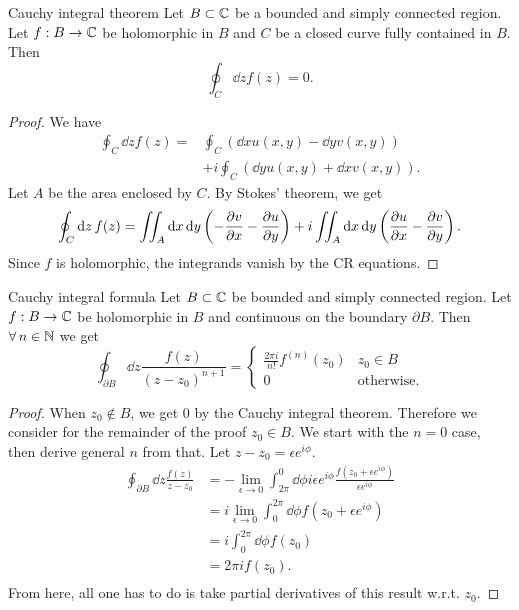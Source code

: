 \begin{theorem}{Cauchy integral theorem}{}
Let $B\subset\mathbb{C}$ be a bounded and simply connected region. Let $f:B\to\mathbb{C}$ be
holomorphic in $B$ and $C$ be a closed curve fully contained in $B$. Then
$$
  \oint_C\dd{z}f(z)=0.
$$
\begin{proof}
We have
\begin{equation*}\begin{aligned}
\oint_C\dd{z}f(z)=&\oint_C\left(\dd{x}u(x,y)-\dd{y}v(x,y)\right)\\
                 &+i\oint_C\left(\dd{y}u(x,y)+\dd{x}v(x,y)\right).
\end{aligned}\end{equation*}
Let $A$ be the area enclosed by $C$. By Stokes' theorem, we get
\begin{equation*}
\oint_C\dd{z}f(z)=\iint_A\dd{x}\dd{y}\left(-\pdv{v}{x}-\pdv{u}{y}\right)
                   +i\iint_A\dd{x}\dd{y}\left(\pdv{u}{x}-\pdv{v}{y}\right).
\end{equation*}
Since $f$ is holomorphic, the integrands vanish by the CR equations.
\end{proof}
\end{theorem}

\begin{theorem}{Cauchy integral formula}{}
Let $B\subset\mathbb{C}$ be bounded and simply connected region. Let $f:B\to\mathbb{C}$ be
holomorphic in $B$ and continuous on the boundary $\partial B$.
Then $\operatorname{\forall} n\in\mathbb{N}$ we get
$$
  \oint_{\partial B}\dd{z}\frac{f(z)}{(z-z_0)^{n+1}}=
\begin{cases}
\frac{2\pi i}{n!}f^{(n)}(z_0) & z_0\in B \\
 0            & \text{otherwise}.
\end{cases}
$$
\begin{proof} When $z_0\notin B$, we get 0 by the Cauchy integral theorem.
Therefore we consider for the remainder of the proof $z_0\in B$.
We start with the $n=0$ case, then derive general $n$ from that.
Let $z-z_0=\epsilon e^{i\phi}$.
\begin{equation*}\begin{aligned}
  \oint_{\partial B}\dd{z}\frac{f(z)}{z-z_0}
&=-\lim_{\epsilon\to 0}\int_{2\pi}^0\dd{\phi}
     i\epsilon e^{i\phi}\frac{f(z_0+\epsilon e^{i\phi})}{\epsilon e^{i\phi}}\\
&=i\lim_{\epsilon\to 0}\int_{0}^{2\pi}\dd{\phi}f(z_0+\epsilon e^{i\phi})\\
&=i\int_{0}^{2\pi}\dd{\phi}f(z_0)\\
&=2\pi if(z_0).\\
\end{aligned}\end{equation*}
From here, all one has to do is take partial derivatives of this result 
w.r.t. $z_0$.
\end{proof} 
\end{theorem}

